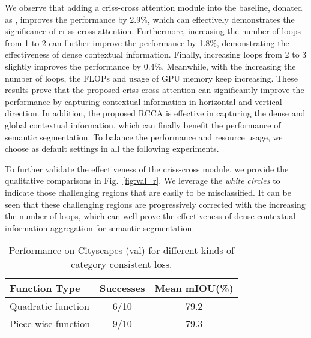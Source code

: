 \documentclass[10pt,journal,compsoc]{IEEEtran}
\begin{document}
We observe that adding a criss-cross attention module into the baseline, donated as , improves the performance by 2.9\%, which can effectively demonstrates the significance of criss-cross attention. Furthermore, increasing the number of loops from 1 to 2 can further improve the performance by 1.8\%, demonstrating the effectiveness of dense contextual information. Finally, increasing loops from 2 to 3 slightly improves the performance by 0.4\%. Meanwhile, with the increasing the number of loops, the FLOPs and  usage of GPU memory keep increasing. These results prove that the proposed criss-cross attention can significantly improve the performance by capturing contextual information in horizontal and vertical direction. In addition, the proposed RCCA is effective in capturing the dense and global contextual information, which can finally benefit the performance of semantic segmentation.
To balance the performance and resource usage, we choose  as default settings in all the following experiments. 

To further validate the effectiveness of the criss-cross module, we provide the qualitative comparisons in Fig.~\ref{fig:val_r}. We leverage the \emph{white} \emph{circles} to indicate those challenging regions that are easily to be misclassified. It can be seen that these challenging regions are progressively corrected with the increasing the number of loops, which can well prove the effectiveness of dense contextual information aggregation for semantic segmentation. \\

\begin{table}[!t]
    \renewcommand{\arraystretch}{1.3}
    \setlength{\tabcolsep}{0.6em}
    \caption{Performance on Cityscapes (val) for different kinds of category consistent loss.}
    \label{tab:ablation_ccl_type}
    \centering \small
    \begin{tabular}{|l|c|c|}
        \hline
        Function Type & Successes & Mean mIOU(\%)  \\
        \hline
        Quadratic function & 6/10 &  79.2 \\
        Piece-wise function & 9/10 & 79.3 \\
        \hline
    \end{tabular}
\end{table}
\end{document}
